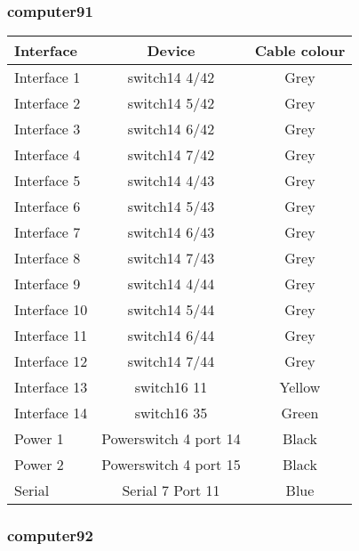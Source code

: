 \subsubsection{computer91}

\begin{table}[H]
\begin{tabular}{|l|c|c|}\hline
Interface & Device & Cable colour \\ \hline
Interface 1 & switch14 4/42 & Grey \\
Interface 2 & switch14 5/42 & Grey \\
Interface 3 & switch14 6/42 & Grey \\
Interface 4 & switch14 7/42 & Grey \\
Interface 5 & switch14 4/43 & Grey \\
Interface 6 & switch14 5/43 & Grey \\
Interface 7 & switch14 6/43 & Grey \\
Interface 8 & switch14 7/43 & Grey \\
Interface 9 & switch14 4/44 & Grey \\
Interface 10 & switch14 5/44 & Grey \\
Interface 11 & switch14 6/44 & Grey \\
Interface 12 & switch14 7/44 & Grey \\
Interface 13 & switch16 11 & Yellow \\
Interface 14 & switch16 35 & Green \\
Power 1 & Powerswitch 4 port 14 & Black \\
Power 2 & Powerswitch 4 port 15 & Black \\
Serial & Serial 7 Port 11 & Blue \\ \hline
\end{tabular}
\end{table}

\subsubsection{computer92}

